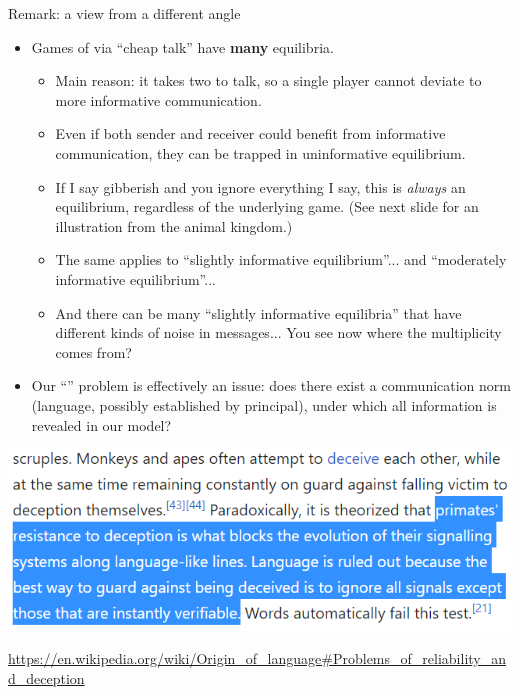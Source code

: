 \documentclass[english,10pt
,aspectratio=169
]{beamer}
\begin{document}
\begin{frame}{Remark: a view from a different angle}
	\begin{itemize}
		\item Games of  via ``cheap talk'' have \alert{\textbf{many} equilibria}. 
		\begin{itemize}
			\item Main reason: it takes two to talk, so a single player cannot deviate to more informative communication.
			\item Even if both sender and receiver could benefit from informative communication, they can be trapped in uninformative equilibrium.
			\item If I say gibberish and you ignore everything I say, this is \emph{always} an equilibrium, regardless of the underlying game. (See next slide for an illustration from the animal kingdom.)
			\item The same applies to ``slightly informative equilibrium''... and ``moderately informative equilibrium''...
			\item And there can be many ``slightly informative equilibria'' that have different kinds of noise in messages... You see now where the multiplicity comes from?
		\end{itemize}
		\item Our ``'' problem is effectively an  issue: does there exist a communication norm (language, possibly established by principal), under which all information is revealed in our model?
	\end{itemize}
\end{frame}


\begin{frame}
	\includegraphics[scale=1.05]{pics/M4/cheaptalkmonke.png}
	\medskip
	
	\url{https://en.wikipedia.org/wiki/Origin_of_language\#Problems_of_reliability_and_deception}
\end{frame}
\end{document}
